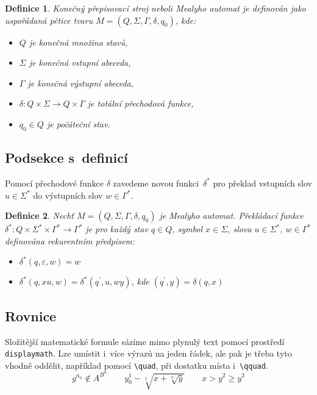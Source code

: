 \documentclass[11pt, twocolumn]{article}[15.03.2024]
\begin{document}
    \newtheorem{definition}{Definice}\label{definice1}
    \begin{definition}
        \emph{Konečný přepisovací stroj} neboli \emph{Mealyho automat} je definován jako uspořádaná pětice tvaru $M=(Q, \varSigma, \varGamma, \delta, q_0)$, kde:
        \begin{itemize}
            \item[$\bullet$] $Q$ je konečná množina \emph{stavů},
            \item[$\bullet$] $\varSigma$ je konečná \emph{vstupní abeceda},
            \item[$\bullet$] $\varGamma$ je konečná \emph{výstupní abeceda},
            \item[$\bullet$] $\delta : Q \times \varSigma \to Q \times \varGamma$ je totální \emph{přechodová funkce},
            \item[$\bullet$] $q_0 \in Q$ je \emph{počáteční stav}.
        \end{itemize}
    \end{definition}

\subsection{Podsekce s~definicí}
    Pomocí přechodové funkce $\delta$ zavedeme novou funkci~$\delta^*$ pro překlad vstupních slov $u \in \varSigma^*$ do výstupních slov $w \in \varGamma^*$.

    \begin{definition} \label{definice2}
        Nechť $M=(Q, \varSigma, \varGamma, \delta, q_0)$ je Mealyho automat. \emph{Překládací funkce} $\delta^* : Q \times \varSigma^* \times \varGamma^* \to \varGamma^*$ je pro každý stav $q \in Q$, symbol $x \in \varSigma$, slova $u \in \varSigma^*$, $w \in \varGamma^*$ definována rekurentním předpisem:
        \begin{itemize}
            \item[$\bullet$] $\delta^*(q, \varepsilon, w) = w$
            \item[$\bullet$] $\delta^*(q, xu, w) = \delta^*(q^\prime, u, wy)$, kde $(q^\prime, y) = \delta(q, x)$
        \end{itemize}
    \end{definition}

\subsection{Rovnice}
    Složitější matematické formule sázíme mimo plynulý text pomocí prostředí \verb|displaymath|. Lze umístit i~více výrazů na jeden řádek, ale pak je třeba tyto vhodně oddělit, například pomocí \verb|\quad|, při dostatku místa i~\verb|\qquad|.
    \begin{displaymath} \label{trifunkce}
        g^{a_n} \notin A^{B^n}\qquad
        y^{1}_{0} - \sqrt[5]{x + \sqrt[7]{y}}\qquad
        x > y^2 \geq y^3
    \end{displaymath}
\end{document}
